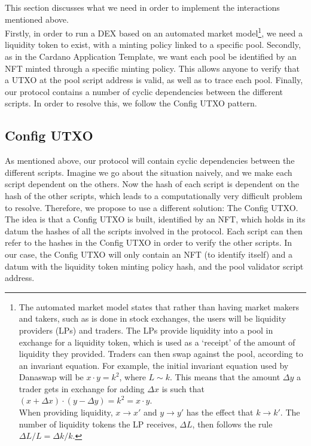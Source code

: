 \documentclass{article}
\begin{document}
This section discusses what we need in order to implement the interactions
mentioned above. \\

Firstly, in order to run a DEX based on an automated market model\footnote{
  The automated market model states that rather than having market makers and
  takers, such as is done in stock exchanges, the users will be liquidity
  providers (LPs) and traders. The LPs provide liquidity into a pool in exchange
  for a liquidity token, which is used as a `receipt' of the amount of liquidity
  they provided. Traders can then swap against the pool, according to an
  invariant equation. For example, the initial invariant equation used by
  Danaswap will be $x \cdot y = k^2$, where $L \sim k$. This means that the
  amount $\Delta y$ a trader gets in exchange for adding $\Delta x$ is such that
  $(x + \Delta x) \cdot (y - \Delta y) = k^2 = x \cdot y$. \\

  When providing liquidity, $x \rightarrow x'$ and $y \rightarrow y'$ has the
  effect that $k \rightarrow k'$. The number of liquidity tokens the LP
  receives, $\Delta L$, then follows the rule $\Delta L / L = \Delta k / k$.
}, we need a liquidity token to exist, with a minting policy linked to a
specific pool.
Secondly, as in the Cardano Application Template, we want each pool be
identified by an NFT minted through a specific minting policy. This allows
anyone to verify that a UTXO at the pool script address is valid, as well as to
trace each pool.
Finally, our protocol contains a number of cyclic dependencies between the
different scripts. In order to resolve this, we follow the Config UTXO pattern.

\subsection{Config UTXO}

As mentioned above, our protocol will contain cyclic dependencies between the
different scripts. Imagine we go about the situation naively, and we make each
script dependent on the others. Now the hash of each script is dependent on the
hash of the other scripts, which leads to a computationally very difficult
problem to resolve. Therefore, we propose to use a different solution: The
Config UTXO. \\

The idea is that a Config UTXO is built, identified by an NFT, which holds in
its datum the hashes of all the scripts involved in the protocol. Each script
can then refer to the hashes in the Config UTXO in order to verify the other
scripts. In our case, the Config UTXO will only contain an NFT (to identify
itself) and a datum with the liquidity token
minting policy hash, and the pool validator script address. \\
\end{document}
